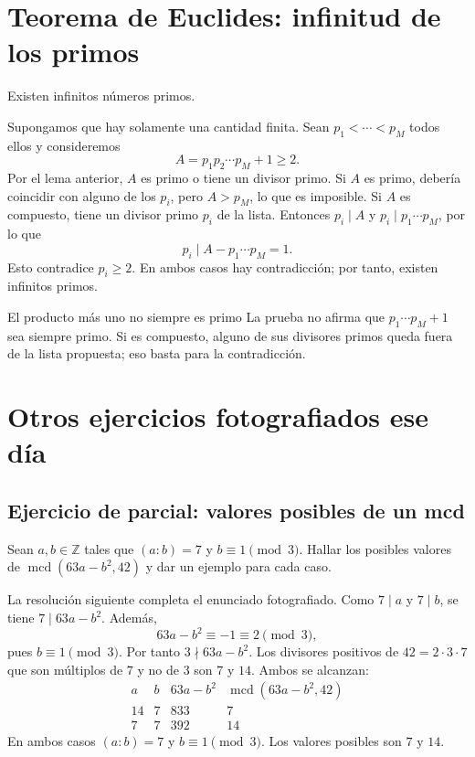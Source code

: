 \section{Teorema de Euclides: infinitud de los primos}
\begin{proposicion}[{title={Teorema de Euclides}}]
Existen infinitos números primos.
\end{proposicion}
\begin{demostracion}
Supongamos que hay solamente una cantidad finita. Sean $p_1<\cdots<p_M$ todos ellos y consideremos
\[
A=p_1p_2\cdots p_M+1\geq2.
\]
Por el lema anterior, $A$ es primo o tiene un divisor primo.
Si $A$ es primo, debería coincidir con alguno de los $p_i$, pero $A>p_M$, lo que es imposible. Si $A$ es compuesto, tiene un divisor primo $p_i$ de la lista. Entonces $p_i\mid A$ y $p_i\mid p_1\cdots p_M$, por lo que
\[
p_i\mid A-p_1\cdots p_M=1.
\]
Esto contradice $p_i\geq2$. En ambos casos hay contradicción; por tanto, existen infinitos primos.
\end{demostracion}
\begin{nota}{El producto más uno no siempre es primo}
La prueba no afirma que $p_1\cdots p_M+1$ sea siempre primo. Si es compuesto, alguno de sus divisores primos queda fuera de la lista propuesta; eso basta para la contradicción.
\end{nota}

\section{Otros ejercicios fotografiados ese día}
\subsection{Ejercicio de parcial: valores posibles de un mcd}
\begin{ejercicio}
Sean $a,b\in\mathbb Z$ tales que $(a:b)=7$ y $b\equiv1\pmod3$. Hallar los posibles valores de $\operatorname{mcd}(63a-b^2,42)$ y dar un ejemplo para cada caso.
\end{ejercicio}
\begin{solucion}
La resolución siguiente completa el enunciado fotografiado. Como $7\mid a$ y $7\mid b$, se tiene $7\mid63a-b^2$. Además,
\[
63a-b^2\equiv-1\equiv2\pmod3,
\]
pues $b\equiv1\pmod3$. Por tanto $3\nmid63a-b^2$.
Los divisores positivos de $42=2\cdot3\cdot7$ que son múltiplos de $7$ y no de $3$ son $7$ y $14$. Ambos se alcanzan:
\[
\begin{array}{c|c|c|c}
a&b&63a-b^2&\operatorname{mcd}(63a-b^2,42)\\\hline
14&7&833&7\\7&7&392&14
\end{array}
\]
En ambos casos $(a:b)=7$ y $b\equiv1\pmod3$. Los valores posibles son $\boxed{7\text{ y }14}$.
\end{solucion}

